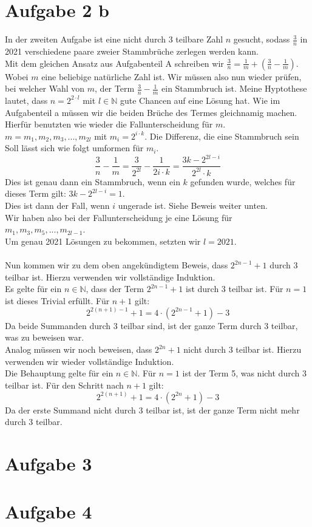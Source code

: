 \documentclass{article}
\begin{document}
\section*{Aufgabe 2 b}
In der zweiten Aufgabe ist eine nicht durch 3 teilbare Zahl \(n\) gesucht, 
sodass \(\frac{3}{n}\) in 2021 verschiedene paare zweier Stammbrüche zerlegen werden kann.\\
Mit dem gleichen Ansatz aus Aufgabenteil A schreiben wir \(\frac{3}{n} = \frac{1}{m} + (\frac{3}{n} - \frac{1}{m})\). 
Wobei \(m\) eine beliebige natürliche Zahl ist. Wir müssen also nun wieder prüfen, bei welcher Wahl von \(m\), 
der Term \(\frac{3}{n} - \frac{1}{m}\) ein Stammbruch ist. Meine Hyptothese lautet, dass \(n = 2^{2 \cdot l}\) mit \(l \in \mathbb{N}\) 
gute Chancen auf eine Lösung hat. Wie im Aufgabenteil a müssen wir die beiden Brüche des Termes gleichnamig machen.\\
Hierfür benutzten wie wieder die Fallunterscheidung für $m$.\\
\(m = m_1, m_2, m_3, ..., m_{2l}\) mit \(m_i = 2^{i \cdot k}\). 
Die Differenz, die eine Stammbruch sein Soll lässt sich wie folgt umformen für $m_i$. 
\begin{equation}
    \frac{3}{n} - \frac{1}{m} = \frac{3}{2^{2l}} - \frac{1}{2i \cdot k} = \frac{3k - 2^{2l - i}}{2^{2l} \cdot k}
\end{equation}
Dies ist genau dann ein Stammbruch, wenn ein $k$ gefunden wurde, welches für dieses Term gilt: $3k - 2^{2l - i} = 1$.\\
Dies ist dann der Fall, wenn $i$ ungerade ist. Siehe Beweis weiter unten.\\
Wir haben also bei der Fallunterscheidung je eine Lösung für \(m_1, m_3, m_5, ..., m_{2l - 1}\).\\
Um genau 2021 Lösungen zu bekommen, setzten wir  $l = 2021$.\\\\
Nun kommen wir zu dem oben angekündigtem Beweis, dass \(2^{2n - 1} + 1\) durch 3 teilbar ist. Hierzu verwenden wir vollständige Induktion.\\
Es gelte für ein \(n \in \mathbb{N}\), dass der Term \(2^{2n - 1} + 1\) ist durch 3 teilbar ist. Für $n = 1$ ist dieses Trivial erfüllt. Für $n + 1$ gilt: 
\begin{equation}
    2^{2(n + 1) - 1} + 1 = 4 \cdot (2^{2n - 1} + 1) - 3
\end{equation}
Da beide Summanden durch 3 teilbar sind, ist der ganze Term durch 3 teilbar, was zu beweisen war.\\
Analog müssen wir noch beweisen, dass \(2^{2n} + 1\) nicht durch 3 teilbar ist. Hierzu verwenden wir wieder vollständige Induktion.\\
Die Behauptung gelte für ein \(n \in \mathbb{N}\). Für $n = 1$ ist der Term 5, was nicht durch 3 teilbar ist. Für den Schritt nach $n + 1$ gilt: 
\begin{equation}
    2^{2(n + 1)} + 1 = 4 \cdot (2^{2n} + 1) - 3
\end{equation}
Da der erste Summand nicht durch 3 teilbar ist, ist der ganze Term nicht mehr durch 3 teilbar.
\section*{Aufgabe 3}
\section*{Aufgabe 4}
\end{document}
